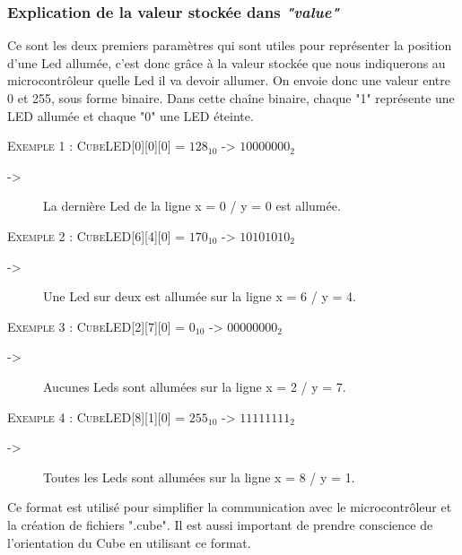 \documentclass[a4paper,12pt]{article}
\begin{document}
\subsubsection{Explication de la valeur stockée dans \emph{"value"}}

\noindent Ce sont les deux premiers paramètres qui sont utiles pour représenter la position d'une Led allumée, c'est donc grâce à la valeur stockée que nous indiquerons au microcontrôleur quelle Led il va devoir allumer. On envoie donc une valeur entre 0 et 255, sous forme binaire. Dans cette chaîne binaire, chaque "1" représente une LED allumée et chaque "0" une LED éteinte.
\vspace{1cm} 

\noindent \textsc{Exemple 1 : CubeLED}[0][0][0] = $128_{10}$ -> $10000000_2$ 
\begin{description}
	\item[->]La dernière Led de la ligne x = 0 / y = 0 est allumée.\\
\end{description}

\noindent \textsc{Exemple 2 : CubeLED}[6][4][0] = $170_{10}$ -> $10101010_2$ 
\begin{description}
	\item[->]Une Led sur deux est allumée sur la ligne x = 6 / y = 4.\\
\end{description}

\noindent \textsc{Exemple 3 : CubeLED}[2][7][0] = $0_{10}$ -> $00000000_2$ 
\begin{description}
	\item[->]Aucunes Leds sont allumées sur la ligne x = 2 / y = 7.\\
\end{description}

\noindent \textsc{Exemple 4 : CubeLED}[8][1][0] = $255_{10}$ -> $11111111_2$ 
\begin{description}
	\item[->]Toutes les Leds sont allumées sur la ligne x = 8 / y = 1.\\
\end{description}


\noindent Ce format est utilisé pour simplifier la communication avec le microcontrôleur et la création de fichiers ".cube". Il est aussi important de prendre conscience de l’orientation du Cube en utilisant ce format.

\vspace{0.5cm}
\end{document}
